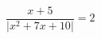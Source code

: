 \begin{ex}[type=equation]
	\begin{condition}
		$\dfrac{x + 5}{\big|x^2 + 7x + 10\big|}= 2$
	\end{condition}
\end{ex}